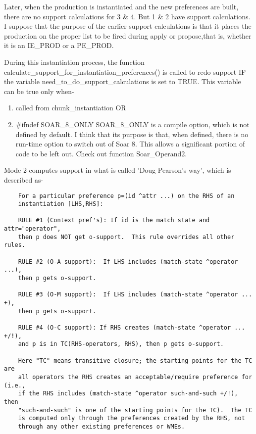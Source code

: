 {	Later, when the production is instantiated and the new preferences are built, there are no support calculations for 3 \& 4. But 1 \& 2 have support calculations. I suppose that the purpose of the earlier support calculations is that it places the production on the proper list to be fired during apply or propose,that is, whether it is an IE\_PROD or a PE\_PROD.
	
	During this instantiation process, the function calculate\_support\_for\_instantiation\_preferences() is called to redo support IF the variable need\_to\_do\_support\_calculations is set to TRUE. This variable can be true only when-
	
	\begin{enumerate}
		\item  called from chunk\_instantiation OR
		\item  \#ifndef SOAR\_8\_ONLY
		SOAR\_8\_ONLY is a compile option, which is not defined by default. I think that its purpose is that, when defined, there is no run-time option to switch out of Soar 8. This allows a significant portion of code to be left out. Check out function Soar\_Operand2. 
	\end{enumerate}
	
	
	Mode 2 computes support in what is called 'Doug Pearson's way', which is described as-
	
	\begin{verbatim}
	For a particular preference p=(id ^attr ...) on the RHS of an
	instantiation [LHS,RHS]:
	
	RULE #1 (Context pref's): If id is the match state and attr="operator", 
	then p does NOT get o-support.  This rule overrides all other rules.
	
	RULE #2 (O-A support):  If LHS includes (match-state ^operator ...),
	then p gets o-support.
	
	RULE #3 (O-M support):  If LHS includes (match-state ^operator ... +),
	then p gets o-support.
	
	RULE #4 (O-C support): If RHS creates (match-state ^operator ... +/!),
	and p is in TC(RHS-operators, RHS), then p gets o-support.
	
	Here "TC" means transitive closure; the starting points for the TC are 
	all operators the RHS creates an acceptable/require preference for (i.e., 
	if the RHS includes (match-state ^operator such-and-such +/!), then 
	"such-and-such" is one of the starting points for the TC).  The TC
	is computed only through the preferences created by the RHS, not
	through any other existing preferences or WMEs.
	

\end{verbatim}}
